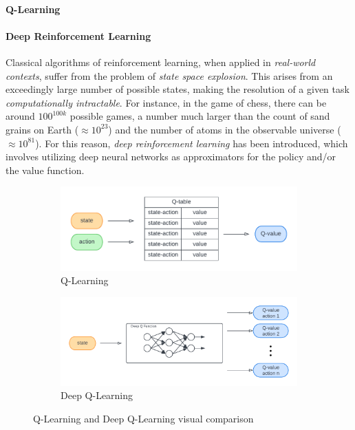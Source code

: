 \documentclass[12pt,a4paper,openright,twoside]{book}
\begin{document}
\paragraph{Q-Learning}

\paragraph{Deep Reinforcement Learning}


Classical algorithms of reinforcement learning, when applied in \emph{real-world contexts}, suffer from the problem of \emph{state space explosion}.
    This arises from an exceedingly large number of possible states, making the resolution of a given task \emph{computationally intractable}. 
    For instance, in the game of chess, there can be around $100^{100k}$ possible games, a number much larger than 
    the count of sand grains on Earth ($\approx 10^{23}$) and the number of atoms in the observable universe 
    ($\approx 10^{81}$). 
    For this reason, \emph{deep reinforcement learning} has been introduced, which involves utilizing deep neural networks
    as approximators for the policy and/or the value function.


\begin{figure}[t]
    \begin{subfigure}[b]{0.49\textwidth}
        \centering
        \includegraphics[width=\textwidth]{figures/q-learning.pdf}
        \caption{Q-Learning}
        \label{fig:ql}
    \end{subfigure}
    \begin{subfigure}[b]{0.49\textwidth}
        \centering
        \includegraphics[width=\textwidth]{figures/deepQL.pdf}
        \caption{Deep Q-Learning}
        \label{fig:dqn}
    \end{subfigure}
\caption{Q-Learning and Deep Q-Learning visual comparison}\vspace{-10pt}
\end{figure}
\end{document}
